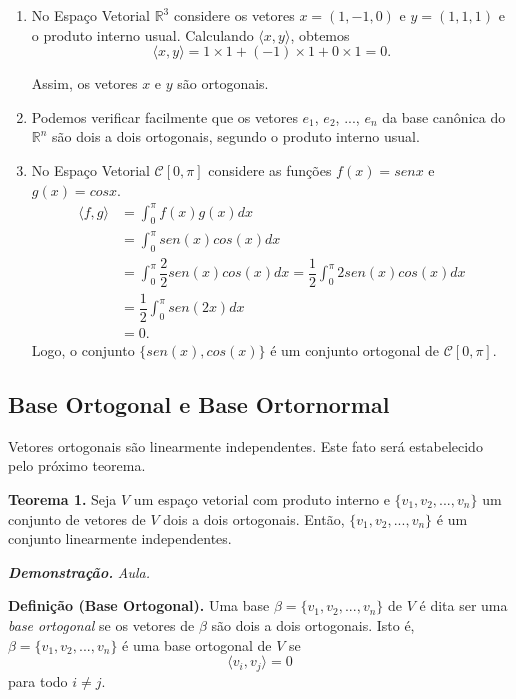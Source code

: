 \begin{enumerate}


\item   No {Espaço Vetorial $\mathbb{R}^3$} considere os vetores $x=(1, -1, 0)$ e $y=(1, 1, 1)$ e o produto interno usual.  Calculando $\langle x, y \rangle$,   obtemos
 $$\langle x, y \rangle = 1\times 1+ (-1)\times 1+ 0\times 1=0.$$

Assim,  os vetores $x$ e $y$ são ortogonais.


\item Podemos verificar facilmente  que os vetores $e_1$, $e_2$, ..., $e_n$ da base canônica do $\mathbb{R}^n$ são dois a dois ortogonais, segundo o produto interno usual.


\item  No Espaço Vetorial $\mathcal{C}[0,\pi]$ considere as funções $f(x)=senx$ e $g(x)=cosx$.
 \begin{align*}\langle f, g \rangle &= \int_{0}^{\pi}f(x)g(x)dx\\
&= \int_{0}^{\pi}sen(x)cos(x)dx\\
	&=\int_{0}^{\pi}\dfrac{2}{2}sen(x)cos(x)dx=\dfrac{1}{2}\int_{0}^{\pi}{2}sen(x)cos(x)dx\\
    &=\dfrac{1}{2}\int_{0}^{\pi}sen(2x)dx\\
 &=0.
\end{align*}
Logo, o conjunto $\{ sen(x), cos(x)\}$ é um conjunto ortogonal de   $\mathcal{C}[0,\pi]$.


\end{enumerate}

\subsection {\textbf{Base Ortogonal e Base Ortornormal}}

Vetores ortogonais são linearmente independentes.  Este fato será estabelecido pelo próximo teorema.

\vspace{0.7cm}
\textbf{Teorema 1.} Seja $V$ um espaço vetorial com produto interno e $\{v_1, v_2,...,v_n\}$ um conjunto de vetores de $V$  dois a dois ortogonais. Então, $\{v_1, v_2,...,v_n\}$  é um conjunto  linearmente independentes.

\textbf{\textit{Demonstração.}} \textit{Aula.}



\vspace{0.7cm}
\textbf{Definição (Base Ortogonal).} Uma base  $ \beta =\{v_1, v_2,...,v_n\}$  de $ V$ é dita ser uma \textit{base ortogonal} se os vetores de $\beta$  são dois a dois ortogonais. Isto é,  $ \beta =\{v_1, v_2,...,v_n\}$ é uma base ortogonal de $V$  se  $$ \langle v_i, v_j \rangle=0$$
para todo $i \neq j$.




